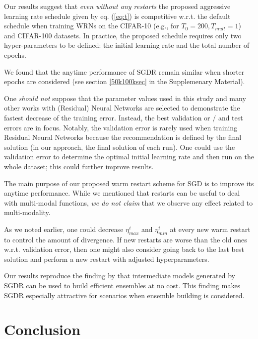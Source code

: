 \documentclass{article} %
\begin{document}
Our results suggest that \textit{even without any restarts} the proposed aggressive learning rate schedule given by eq. (\ref{eq:t}) is competitive w.r.t. the default schedule when training WRNs on the CIFAR-10 (e.g., for $T_0=200, T_{mult}=1$) and CIFAR-100 datasets. In practice, the proposed schedule requires only two hyper-parameters to be defined: the initial learning rate and the total number of epochs. 

We found that the anytime performance of SGDR remain similar when shorter epochs are considered (see section \ref{50k100ksec} in the Supplemenary Material). 

One \textit{should not} suppose that the parameter values used in this study and many other works with (Residual) Neural Networks 
are selected to demonstrate the fastest decrease of the training error. Instead, the best validation or / and test errors are in focus. 
Notably, the validation error is rarely used when training Residual Neural Networks because the recommendation is defined by the final solution (in our approach, the final solution of each run). 
One could use the validation error to determine the optimal initial learning rate and then run on the whole dataset;
this could further improve results. 


The main purpose of our proposed warm restart scheme for SGD is to improve its anytime performance. 
While we mentioned that restarts can be useful to deal with multi-modal functions, 
\textit{we do not claim} that we observe any effect related to multi-modality.

As we noted earlier, one could decrease $\eta^i_{max}$ and $\eta^i_{min}$ at every new warm restart to 
control the amount of divergence. If new restarts are worse than the old ones w.r.t. validation error, 
then one might also consider going back to the last best solution and perform a new restart with 
adjusted hyperparameters. 

Our results reproduce the finding by \cite{SnapshotICLR2017} that intermediate models generated by SGDR can be used to build efficient ensembles at no cost.  This finding makes SGDR especially attractive for scenarios when ensemble building is considered. 

\section{Conclusion}
\end{document}
